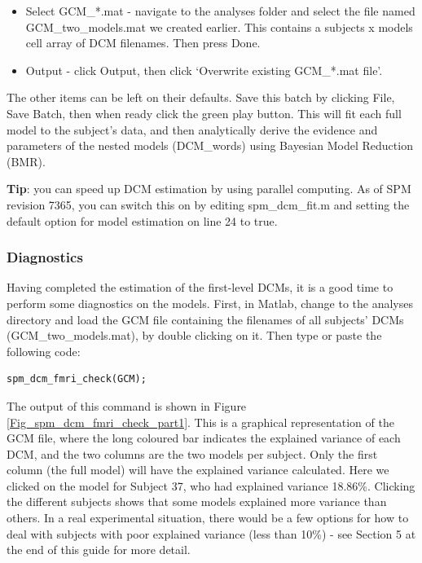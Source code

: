 \documentclass{article}
\begin{document}
\begin{itemize}
    \item Select GCM\_*.mat - navigate to the analyses folder and select the file named GCM\_two\_models.mat we created earlier. This contains a subjects x models cell array of DCM filenames. Then press Done.
    \item Output - click Output, then click `Overwrite existing GCM\_*.mat file'.
\end{itemize}

The other items can be left on their defaults. Save this batch by clicking File, Save Batch, then when ready click the green play button. This will fit each full model to the subject's data, and then analytically derive the evidence and parameters of the nested models (DCM\_words) using Bayesian Model Reduction (BMR).

\textbf{Tip}: you can speed up DCM estimation by using parallel computing. As of SPM revision 7365, you can switch this on by editing spm\_dcm\_fit.m and setting the default option for model estimation on line 24 to true.

\subsubsection{Diagnostics} \label{GUI_diagnostics}
Having completed the estimation of the first-level DCMs, it is a good time to perform some diagnostics on the models. First, in Matlab, change to the analyses directory and load the GCM file containing the filenames of all subjects' DCMs (GCM\_two\_models.mat), by double clicking on it. Then type or paste the following code:

\begin{lstlisting}[style=Matlab-editor, caption=DCM for fMRI diagnostics]
spm_dcm_fmri_check(GCM);
\end{lstlisting}

The output of this command is shown in Figure \ref{Fig_spm_dcm_fmri_check_part1}. This is a graphical representation of the GCM file, where the long coloured bar indicates the explained variance of each DCM, and the two columns are the two models per subject. Only the first column (the full model) will have the explained variance calculated. Here we clicked on the model for Subject 37, who had explained variance 18.86\%. Clicking the different subjects shows that some models explained more variance than others. In a real experimental situation, there would be a few options for how to deal with subjects with poor explained variance (less than 10\%) - see Section 5 at the end of this guide for more detail.
\end{document}
